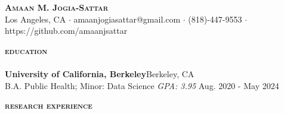 \documentclass[a4paper]{article}
\newcommand{\lineunder} {
    \vspace*{-8pt} \\
    \hspace*{-18pt} \hrulefill \\
}
\newcommand{\header} [1] {
    {\hspace*{-18pt}\vspace*{6pt} \large{\textbf{\textsc{\MakeLowercase{#1}}}}}
    \vspace*{-6pt}\lineunder
}
\begin{document}


 \vspace{50pt}
\begin{center}
	{\Huge \scshape \bfseries {Amaan M. Jogia-Sattar}}\\
 \vspace{2mm}
	Los Angeles, CA $\cdot$ amaanjogiasattar@gmail.com $\cdot$ (818)-447-9553 $\cdot$ https://github.com/amaanjsattar \\
\end{center}

\header{Education}
\vspace{2mm}
\textbf{University of California, Berkeley}\hfill Berkeley, CA\\
B.A. Public Health; Minor: Data Science
\textit{GPA: 3.95} \hfill Aug. 2020 - May 2024\\
\vspace{3mm}

\header{Research Experience}
\vspace{2mm}
\end{document}

